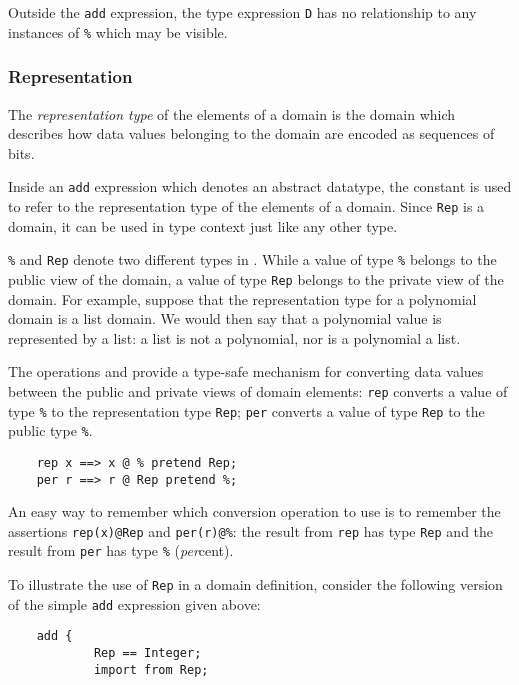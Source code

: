 {Outside the \verb"add" expression, the type expression \verb"D" has no
relationship to any instances of \verb"%" which may be visible.

\subsubsection{Representation}

The {\em representation type\/} of the elements of a domain is the domain
which describes how data values belonging to the domain are encoded as
sequences of bits.

Inside an \verb"add" expression which denotes an abstract datatype,
the constant  is used to refer to the representation type
of the elements of a domain.  Since \verb"Rep" is a domain, it can be
used in type context just like any other type.

\verb"%" and \verb"Rep" denote two different types in \asharp{}.
While a value of type \verb"%" belongs to the public view of the domain,
a value of type \verb"Rep" belongs to the private view of the domain.
For example, suppose that the representation type for a polynomial
domain is a list domain.  We would then say that a polynomial value is
represented by a list: a list is not a polynomial, nor is a polynomial a
list.

The operations  and  provide a type-safe mechanism
for converting data values between the public and private views of
domain elements: \verb"rep" converts a value of type \verb"%" to the
representation type \verb"Rep"; \verb"per" converts a value of type
\verb"Rep" to the public type \verb"%".

\begin{small}
\begin{verbatim}
    rep x ==> x @ % pretend Rep;
    per r ==> r @ Rep pretend %;
\end{verbatim}
\end{small}

An easy way to remember which conversion operation to use is to remember
the assertions \verb"rep(x)@Rep" and \verb"per(r)@%":  the result from
\verb"rep" has type \verb"Rep" and the result from \verb"per" has type
\verb"%" ({\em per}cent).

To illustrate the use of \verb"Rep" in a domain definition, consider
the following version of the simple \verb"add" expression given above:

\begin{small}
\begin{verbatim}
    add {
            Rep == Integer;
            import from Rep;


\end{verbatim}
\end{small}}
